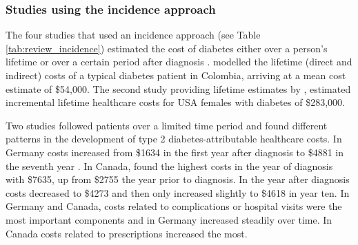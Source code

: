 \subsubsection{Studies using the incidence approach}
The four studies that used an incidence approach (see Table \ref{tab:review_incidence}) estimated the cost of diabetes either over a person's lifetime \parencite{Gonzalez2009b,Birnbaum2003c} or over a certain period after diagnosis \textcite{Johnson2006d,Martin2007b}. \textcite{Gonzalez2009b} modelled the lifetime (direct and indirect) costs of a typical diabetes patient in Colombia, arriving at a mean cost estimate of \$54,000. The second study providing lifetime estimates by \textcite{Birnbaum2003c}, estimated incremental lifetime healthcare costs for USA females with diabetes of \$283,000.

Two studies followed patients over a limited time period and found different patterns in the development of type 2 diabetes-attributable healthcare costs. In Germany costs increased from  \$1634 in the first year after diagnosis to \$4881 in the seventh year \parencite{Martin2007b}. In Canada, \textcite{Johnson2006d} found the highest costs in the year of diagnosis with \$7635, up from \$2755 the year prior to diagnosis. In the year after diagnosis costs decreased to \$4273 and then only increased slightly to \$4618 in year ten. In Germany and Canada, costs related to complications or hospital visits were the most important components and in Germany increased steadily over time. In Canada costs related to prescriptions increased the most.

